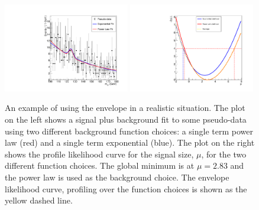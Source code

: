 \begin{figure}
  \begin{center}
    \includegraphics[width=0.49\textwidth]{analysis/plots/envelope_explain2.pdf}
    \includegraphics[width=0.49\textwidth]{analysis/plots/envelope_explain3.pdf}
    \caption[A toy example of using the envelope method for estimating the background]{An example of using the envelope in a realistic situation. The plot on the left shows a signal plus background fit to some pseudo-data using two different background function choices: a single term power law (red) and a single term exponential (blue). The plot on the right shows the profile likelihood curve for the signal size, $\mu$, for the two different function choices. The global minimum is at $\mu=2.83$ and the power law is used as the background choice. The envelope likelihood curve, profiling over the function choices is shown as the yellow dashed line.}
    \label{fig:envelope_explain2}
  \end{center}
\end{figure}

